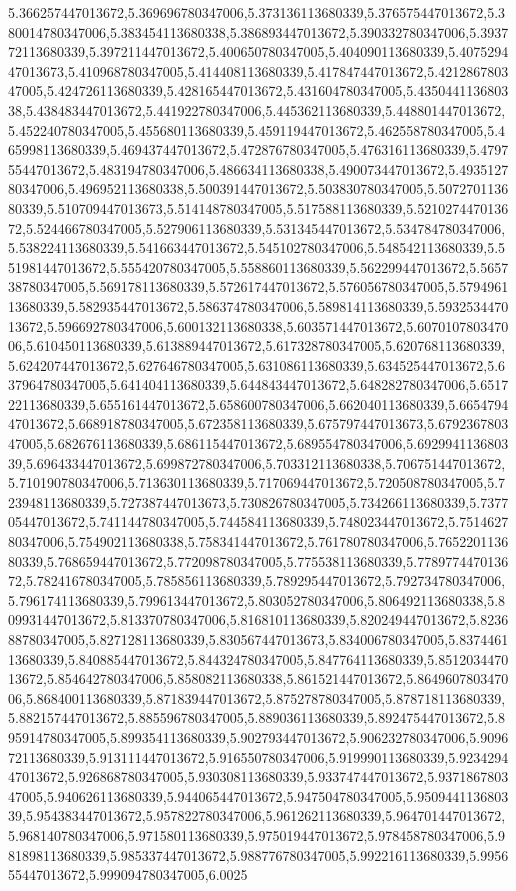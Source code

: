 5.366257447013672,5.369696780347006,5.373136113680339,5.376575447013672,5.380014780347006,5.383454113680338,5.386893447013672,5.390332780347006,5.393772113680339,5.397211447013672,5.400650780347005,5.404090113680339,5.407529447013673,5.410968780347005,5.414408113680339,5.417847447013672,5.421286780347005,5.424726113680339,5.428165447013672,5.431604780347005,5.435044113680338,5.438483447013672,5.441922780347006,5.445362113680339,5.448801447013672,5.452240780347005,5.455680113680339,5.459119447013672,5.462558780347005,5.465998113680339,5.469437447013672,5.472876780347005,5.476316113680339,5.479755447013672,5.483194780347006,5.486634113680338,5.490073447013672,5.493512780347006,5.496952113680338,5.500391447013672,5.503830780347005,5.507270113680339,5.510709447013673,5.514148780347005,5.517588113680339,5.521027447013672,5.524466780347005,5.527906113680339,5.531345447013672,5.534784780347006,5.538224113680339,5.541663447013672,5.545102780347006,5.548542113680339,5.551981447013672,5.555420780347005,5.558860113680339,5.562299447013672,5.565738780347005,5.569178113680339,5.572617447013672,5.576056780347005,5.579496113680339,5.582935447013672,5.586374780347006,5.589814113680339,5.593253447013672,5.596692780347006,5.600132113680338,5.603571447013672,5.607010780347006,5.610450113680339,5.613889447013672,5.617328780347005,5.620768113680339,5.624207447013672,5.627646780347005,5.631086113680339,5.634525447013672,5.637964780347005,5.641404113680339,5.644843447013672,5.648282780347006,5.651722113680339,5.655161447013672,5.658600780347006,5.662040113680339,5.665479447013672,5.668918780347005,5.672358113680339,5.675797447013673,5.679236780347005,5.682676113680339,5.686115447013672,5.689554780347006,5.692994113680339,5.696433447013672,5.699872780347006,5.703312113680338,5.706751447013672,5.710190780347006,5.713630113680339,5.717069447013672,5.720508780347005,5.723948113680339,5.727387447013673,5.730826780347005,5.734266113680339,5.737705447013672,5.741144780347005,5.744584113680339,5.748023447013672,5.751462780347006,5.754902113680338,5.758341447013672,5.761780780347006,5.765220113680339,5.768659447013672,5.772098780347005,5.775538113680339,5.778977447013672,5.782416780347005,5.785856113680339,5.789295447013672,5.792734780347006,5.796174113680339,5.799613447013672,5.803052780347006,5.806492113680338,5.809931447013672,5.813370780347006,5.816810113680339,5.820249447013672,5.823688780347005,5.827128113680339,5.830567447013673,5.834006780347005,5.837446113680339,5.840885447013672,5.844324780347005,5.847764113680339,5.851203447013672,5.854642780347006,5.858082113680338,5.861521447013672,5.864960780347006,5.868400113680339,5.871839447013672,5.875278780347005,5.878718113680339,5.882157447013672,5.885596780347005,5.889036113680339,5.892475447013672,5.895914780347005,5.899354113680339,5.902793447013672,5.906232780347006,5.909672113680339,5.913111447013672,5.916550780347006,5.919990113680339,5.923429447013672,5.926868780347005,5.930308113680339,5.933747447013672,5.937186780347005,5.940626113680339,5.944065447013672,5.947504780347005,5.950944113680339,5.954383447013672,5.957822780347006,5.961262113680339,5.964701447013672,5.968140780347006,5.971580113680339,5.975019447013672,5.978458780347006,5.981898113680339,5.985337447013672,5.988776780347005,5.992216113680339,5.995655447013672,5.999094780347005,6.0025